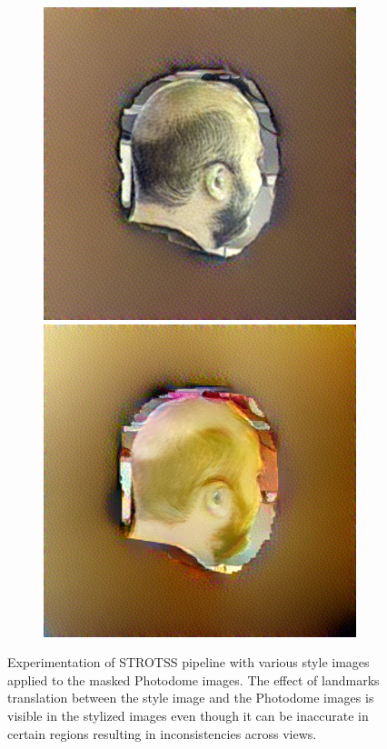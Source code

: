 \begin{figure}
\begin{subfigure}{0.22\linewidth}
        \includegraphics[width=\textwidth]{Figures/failed/stross/textures/16/stylized_view_8-C-5-1_123851_737.png}
        \includegraphics[width=\textwidth]{Figures/failed/stross/textures/59/stylized_view_8-C-5-1_123851_737.png}
	\end{subfigure}
    \caption{Experimentation of STROTSS pipeline with various style images applied to the masked Photodome images. The effect of landmarks translation between the style image and the Photodome images is visible in the stylized images even though it can be inaccurate in certain regions resulting in inconsistencies across views.}
    \label{fig:stross_texture_style}

\end{figure}

